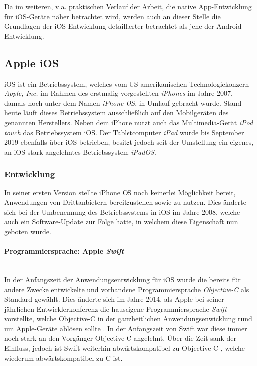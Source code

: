 Da im weiteren, v.a. praktischen Verlauf der Arbeit, die native App-Entwicklung für iOS-Geräte näher betrachtet wird, werden auch an dieser Stelle die Grundlagen der iOS-Entwicklung detaillierter betrachtet als jene der Android-Entwicklung.

\subsection{Apple iOS} \label{subsec:apple_ios}

iOS ist ein Betriebssystem, welches vom US-amerikanischen Technologiekonzern \textit{Apple, Inc.} im Rahmen des erstmalig vorgestellten \textit{iPhones} im Jahre 2007, damals noch unter dem Namen \textit{iPhone OS}, in Umlauf gebracht wurde. Stand heute läuft dieses Betriebssystem ausschließlich auf den Mobilgeräten des genannten Herstellers. Neben dem iPhone nutzt auch das Multimedia-Gerät \textit{iPod touch} das Betriebssystem iOS. Der Tabletcomputer \textit{iPad} wurde bis September 2019 ebenfalls über iOS betrieben, besitzt jedoch seit der Umstellung ein eigenes, an iOS stark angelehntes Betriebssystem \textit{iPadOS}.

\subsubsection{Entwicklung}

In seiner ersten Version stellte iPhone OS noch keinerlei Möglichkeit bereit, Anwendungen von Drittanbietern bereitzustellen sowie zu nutzen. Dies änderte sich bei der Umbenennung des Betriebssystems in iOS im Jahre 2008, welche auch ein Software-Update zur Folge hatte, in welchem diese Eigenschaft nun geboten wurde.

\paragraph{Programmiersprache: Apple \textit{Swift}}\mbox{}\\
In der Anfangszeit der Anwendungsentwicklung für iOS wurde die bereits für andere Zwecke entwickelte und vorhandene Programmiersprache \textit{Objective-C} als Standard gewählt. Dies änderte sich im Jahre 2014, als Apple bei seiner jährlichen Entwicklerkonferenz die hauseigene Programmiersprache \textit{Swift} vorstellte, welche Objective-C in der ganzheitlichen Anwendungsenwicklung rund um Apple-Geräte ablösen sollte \cite{AppleSwift}. In der Anfangszeit von Swift war diese immer noch stark an den Vorgänger Objective-C angelehnt. Über die Zeit sank der Einfluss, jedoch ist Swift weiterhin abwärtskompatibel zu Objective-C \cite{AppleSwift}, welche wiederum abwärtskompatibel zu C ist.

